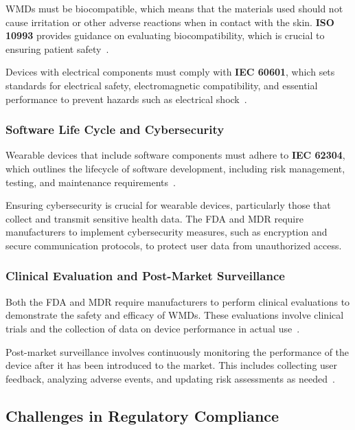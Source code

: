 \documentclass[journal]{IEEEtran}
\begin{document}
        WMDs must be biocompatible, which means that the materials used should not cause irritation or other adverse reactions when in contact with the skin. \textbf{ISO 10993} provides guidance on evaluating biocompatibility, which is crucial to ensuring patient safety~\cite{ISO2018}.

        Devices with electrical components must comply with \textbf{IEC 60601}, which sets standards for electrical safety, electromagnetic compatibility, and essential performance to prevent hazards such as electrical shock~\cite{IEC2012}.

        \subsubsection{Software Life Cycle and Cybersecurity}

        Wearable devices that include software components must adhere to \textbf{IEC 62304}, which outlines the lifecycle of software development, including risk management, testing, and maintenance requirements~\cite{IEC2006}.

        Ensuring cybersecurity is crucial for wearable devices, particularly those that collect and transmit sensitive health data. The FDA and MDR require manufacturers to implement cybersecurity measures, such as encryption and secure communication protocols, to protect user data from unauthorized access.

        \subsubsection{Clinical Evaluation and Post-Market Surveillance}

        Both the FDA and MDR require manufacturers to perform clinical evaluations to demonstrate the safety and efficacy of WMDs. These evaluations involve clinical trials and the collection of data on device performance in actual use~\cite{Dias2018}.

        Post-market surveillance involves continuously monitoring the performance of the device after it has been introduced to the market. This includes collecting user feedback, analyzing adverse events, and updating risk assessments as needed~\cite{EuropeanUnion2024}.

    \subsection{Challenges in Regulatory Compliance}
\end{document}
